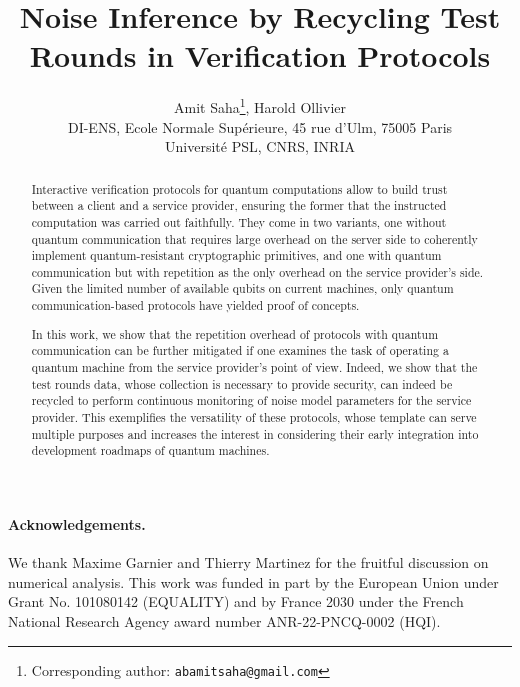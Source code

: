 \documentclass{article}
\author{Amit Saha\thanks{Corresponding author: \texttt{abamitsaha@gmail.com}}, Harold Ollivier \\ DI-ENS, Ecole Normale Supérieure, 45 rue  d'Ulm, 75005 Paris\\ Universit\'e PSL, CNRS, INRIA}
\date{}
\title{Noise Inference by Recycling Test Rounds in Verification Protocols}
\begin{document}
\maketitle

\begin{abstract}
  Interactive verification protocols for quantum computations allow to build trust between a client and a service provider, ensuring the former that the instructed computation was carried out faithfully. They come in two variants, one without quantum communication that requires large overhead on the server side to coherently implement quantum-resistant cryptographic primitives, and one with quantum communication but with repetition as the only overhead on the service provider's side. Given the limited number of available qubits on current machines, only quantum communication-based protocols have yielded proof of concepts.
  
  In this work, we show that the repetition overhead of protocols with quantum communication can be further mitigated if one examines the task of operating a quantum machine from the service provider's point of view. Indeed, we show that the test rounds data, whose collection is necessary to provide security, can indeed be recycled to perform continuous monitoring of noise model parameters for the service provider. This exemplifies the versatility of these protocols, whose template can serve multiple purposes and increases the interest in considering their early integration into development roadmaps of quantum machines.
\end{abstract}











\paragraph{Acknowledgements.} We thank Maxime Garnier and Thierry Martinez for the fruitful discussion on numerical analysis. This work was funded in part by the European Union under Grant No. 101080142 (EQUALITY) and by France 2030 under the French National Research Agency award number ANR-22-PNCQ-0002 (HQI).


%

\appendix

 
\end{document}
